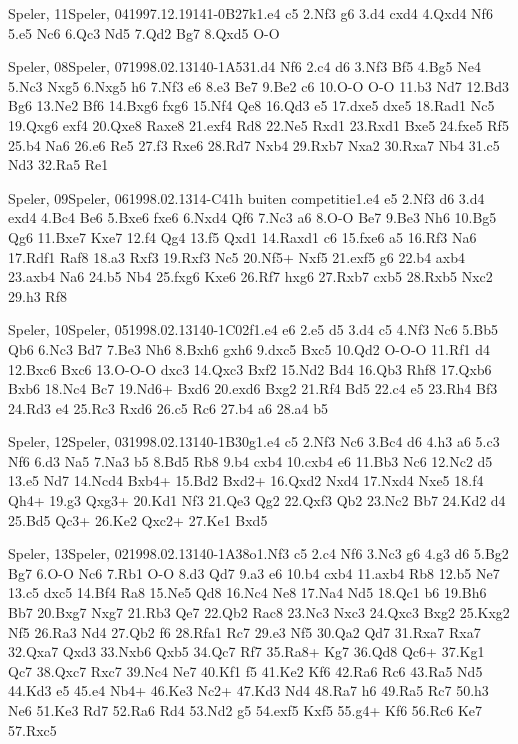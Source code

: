 \documentclass[twocolumn,a4paper,10pt]{report}
\begin{document}
\begin{chessgame}{Speler, 11}{Speler, 04}{1997.12.19}{14}{1-0}{B27k}{1.e4 c5 2.Nf3 g6 3.d4 cxd4 4.Qxd4 Nf6 5.e5 Nc6 6.Qc3 Nd5 7.Qd2 Bg7 8.Qxd5 O-O}\end{chessgame}
\begin{chessgame}{Speler, 08}{Speler, 07}{1998.02.13}{14}{0-1}{A53}{1.d4 Nf6 2.c4 d6 3.Nf3 Bf5 4.Bg5 Ne4 5.Nc3 Nxg5 6.Nxg5 h6 7.Nf3 e6 8.e3 Be7 9.Be2 c6 10.O-O O-O 11.b3 Nd7 12.Bd3 Bg6 13.Ne2 Bf6 14.Bxg6 fxg6 15.Nf4 Qe8 16.Qd3 e5 17.dxe5 dxe5 18.Rad1 Nc5 19.Qxg6 exf4 20.Qxe8 Raxe8 21.exf4 Rd8 22.Ne5 Rxd1 23.Rxd1 Bxe5 24.fxe5 Rf5 25.b4 Na6 26.e6 Re5 27.f3 Rxe6 28.Rd7 Nxb4 29.Rxb7 Nxa2 30.Rxa7 Nb4 31.c5 Nd3 32.Ra5 Re1\mate}\end{chessgame}
\begin{chessgame}{Speler, 09}{Speler, 06}{1998.02.13}{14}{\textonehalf-\textonehalf}{C41h buiten competitie}{1.e4 e5 2.Nf3 d6 3.d4 exd4 4.Bc4 Be6 5.Bxe6 fxe6 6.Nxd4 Qf6 7.Nc3 a6 8.O-O Be7 9.Be3 Nh6 10.Bg5 Qg6 11.Bxe7 Kxe7 12.f4 Qg4 13.f5 Qxd1 14.Raxd1 c6 15.fxe6 a5 16.Rf3 Na6 17.Rdf1 Raf8 18.a3 Rxf3 19.Rxf3 Nc5 20.Nf5+ Nxf5 21.exf5 g6 22.b4 axb4 23.axb4 Na6 24.b5 Nb4 25.fxg6 Kxe6 26.Rf7 hxg6 27.Rxb7 cxb5 28.Rxb5 Nxc2 29.h3 Rf8}\end{chessgame}
\begin{chessgame}{Speler, 10}{Speler, 05}{1998.02.13}{14}{0-1}{C02f}{1.e4 e6 2.e5 d5 3.d4 c5 4.Nf3 Nc6 5.Bb5 Qb6 6.Nc3 Bd7 7.Be3 Nh6 8.Bxh6 gxh6 9.dxc5 Bxc5 10.Qd2 O-O-O 11.Rf1 d4 12.Bxc6 Bxc6 13.O-O-O dxc3 14.Qxc3 Bxf2 15.Nd2 Bd4 16.Qb3 Rhf8 17.Qxb6 Bxb6 18.Nc4 Bc7 19.Nd6+ Bxd6 20.exd6 Bxg2 21.Rf4 Bd5 22.c4 e5 23.Rh4 Bf3 24.Rd3 e4 25.Rc3 Rxd6 26.c5 Rc6 27.b4 a6 28.a4 b5}\end{chessgame}
\begin{chessgame}{Speler, 12}{Speler, 03}{1998.02.13}{14}{0-1}{B30g}{1.e4 c5 2.Nf3 Nc6 3.Bc4 d6 4.h3 a6 5.c3 Nf6 6.d3 Na5 7.Na3 b5 8.Bd5 Rb8 9.b4 cxb4 10.cxb4 e6 11.Bb3 Nc6 12.Nc2 d5 13.e5 Nd7 14.Ncd4 Bxb4+ 15.Bd2 Bxd2+ 16.Qxd2 Nxd4 17.Nxd4 Nxe5 18.f4 Qh4+ 19.g3 Qxg3+ 20.Kd1 Nf3 21.Qe3 Qg2 22.Qxf3 Qb2 23.Nc2 Bb7 24.Kd2 d4 25.Bd5 Qc3+ 26.Ke2 Qxc2+ 27.Ke1 Bxd5}\end{chessgame}
\begin{chessgame}{Speler, 13}{Speler, 02}{1998.02.13}{14}{0-1}{A38o}{1.Nf3 c5 2.c4 Nf6 3.Nc3 g6 4.g3 d6 5.Bg2 Bg7 6.O-O Nc6 7.Rb1 O-O 8.d3 Qd7 9.a3 e6 10.b4 cxb4 11.axb4 Rb8 12.b5 Ne7 13.c5 dxc5 14.Bf4 Ra8 15.Ne5 Qd8 16.Nc4 Ne8 17.Na4 Nd5 18.Qc1 b6 19.Bh6 Bb7 20.Bxg7 Nxg7 21.Rb3 Qe7 22.Qb2 Rac8 23.Nc3 Nxc3 24.Qxc3 Bxg2 25.Kxg2 Nf5 26.Ra3 Nd4 27.Qb2 f6 28.Rfa1 Rc7 29.e3 Nf5 30.Qa2 Qd7 31.Rxa7 Rxa7 32.Qxa7 Qxd3 33.Nxb6 Qxb5 34.Qc7 Rf7 35.Ra8+ Kg7 36.Qd8 Qc6+ 37.Kg1 Qc7 38.Qxc7 Rxc7 39.Nc4 Ne7 40.Kf1 f5 41.Ke2 Kf6 42.Ra6 Rc6 43.Ra5 Nd5 44.Kd3 e5 45.e4 Nb4+ 46.Ke3 Nc2+ 47.Kd3 Nd4 48.Ra7 h6 49.Ra5 Rc7 50.h3 Ne6 51.Ke3 Rd7 52.Ra6 Rd4 53.Nd2 g5 54.exf5 Kxf5 55.g4+ Kf6 56.Rc6 Ke7 57.Rxc5}\end{chessgame}
\end{document}
